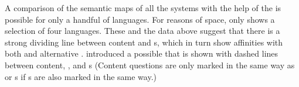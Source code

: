 A comparison of the semantic maps of all the  systems with the help of the  is possible for only a handful of languages. For reasons of space,  only shows a selection of four languages. These and the data above suggest that there is a strong dividing line between content  and s, which in turn show affinities with both  and alternative .  introduced a possible  that is shown with dashed lines between content, , and s (Content questions are only marked in the same way as  or s if s are also marked in the same way.)
